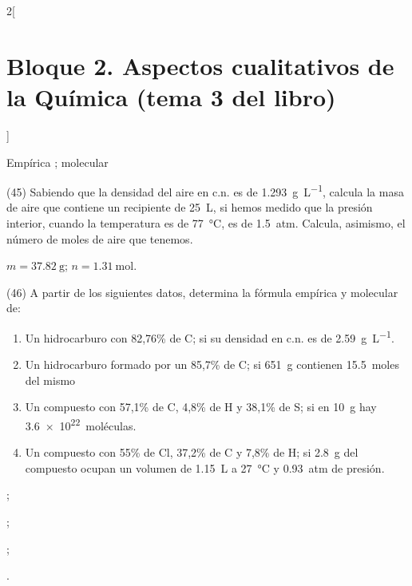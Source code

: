 \documentclass[10pt]{article}
\begin{document}
\begin{multicols}{2}[
    \section{Bloque 2. Aspectos cualitativos de la Química (tema 3 del libro)}
  ]
\begin{solution}
  Empírica ; molecular 
\end{solution}




\begin{exercise}[
    tags    = {},
    topics  = {química,química básica},
    source  = {FQ 1B MGH 2016, p86, e45},
  ]
  (45) Sabiendo que la densidad del aire en c.n. es de \SI{1.293}{\gram\per\liter}, calcula la masa de aire que contiene un recipiente de \SI{25}{\liter}, si hemos medido que la presión interior, cuando la temperatura es de \SI{77}{\celsius}, es de \SI{1.5}{atm}. Calcula, asimismo, el número de moles de aire que tenemos.
\end{exercise}

\begin{solution}
  \( m = \SI{37.82}{\gram} \); \( n = \SI{1.31}{\mole} \).
\end{solution}




\begin{exercise}[
    tags    = {},
    topics  = {química,química básica},
    source  = {FQ 1B MGH 2016, p86, e46},
  ]
  (46) A partir de los siguientes datos, determina la fórmula empírica y molecular de:

  \begin{enumerate}
    \item Un hidrocarburo con 82,76\% de C; si su densidad en c.n. es de \SI{2.59}{\gram\per\liter}.
    \item Un hidrocarburo formado por un 85,7\% de C; si \SI{651}{\gram} contienen \SI{15.5}{moles} del mismo
    \item Un compuesto con 57,1\% de C, 4,8\% de H y 38,1\% de S; si en \SI{10}{\gram} hay \SI{3.6e22}{moléculas}.
    \item Un compuesto con 55\% de Cl, 37,2\% de C y 7,8\% de H; si \SI{2.8}{\gram} del compuesto ocupan un volumen de \SI{1.15}{\liter} a \SI{27}{\celsius} y \SI{0.93}{atm} de presión.
  \end{enumerate}
\end{exercise}

\begin{solution}
  \begin{enumerate*}
    \item {};
    \item {};
    \item {};
    \item {}.
  \end{enumerate*}
\end{solution}





\end{multicols}
\end{document}
